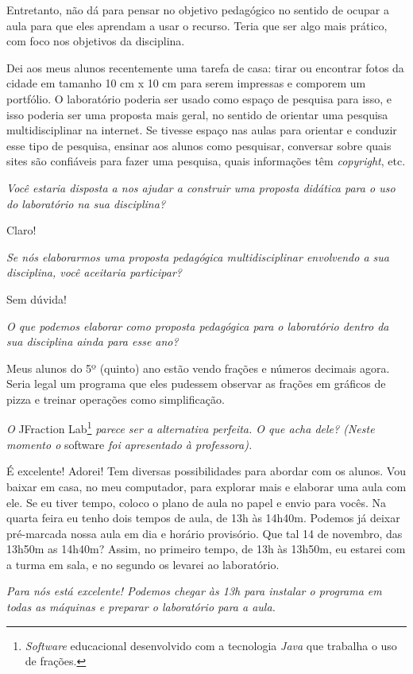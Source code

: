 Entretanto, não dá para pensar no objetivo pedagógico no sentido de ocupar a aula para que eles aprendam a usar o recurso. Teria que ser algo mais prático, com foco nos objetivos da disciplina.

Dei aos meus alunos recentemente uma tarefa de casa: tirar ou encontrar fotos da cidade em tamanho 10 cm x 10 cm para serem impressas e comporem um portfólio. O laboratório poderia ser usado como espaço de pesquisa para isso, e isso poderia ser uma proposta mais geral, no sentido de orientar uma pesquisa multidisciplinar na internet. Se tivesse espaço nas aulas para orientar e conduzir esse tipo de pesquisa, ensinar aos alunos como pesquisar, conversar sobre quais sites são confiáveis para fazer uma pesquisa, quais informações têm \textit{copyright}, etc.

\textit{Você estaria disposta a nos ajudar a construir uma proposta didática para o uso do laboratório na sua disciplina?}

Claro!

\textit{Se nós elaborarmos uma proposta pedagógica multidisciplinar envolvendo a sua disciplina, você aceitaria participar?}

Sem dúvida!

\textit{O que podemos elaborar como proposta pedagógica para o laboratório dentro da sua disciplina ainda para esse ano?}

Meus alunos do 5º (quinto) ano estão vendo frações e números decimais agora. Seria legal um programa que eles pudessem observar as frações em gráficos de pizza e treinar operações como simplificação.

\textit{O} JFraction Lab\footnote{\textit{Software} educacional desenvolvido com a tecnologia \textit{Java} que trabalha o uso de frações.} \textit{parece ser a alternativa perfeita. O que acha dele? (Neste momento o} software \textit{foi apresentado à professora).}

É excelente! Adorei! Tem diversas possibilidades para abordar com os alunos. Vou baixar em casa, no meu computador, para explorar mais e elaborar uma aula com ele. Se eu tiver tempo, coloco o plano de aula no papel e envio para vocês. Na quarta feira eu tenho dois tempos de aula, de 13h às 14h40m. Podemos já deixar pré-marcada nossa aula em dia e horário provisório. Que tal 14 de novembro, das 13h50m as 14h40m? Assim, no primeiro tempo, de 13h às 13h50m, eu estarei com a turma em sala, e no segundo os levarei ao laboratório.

\textit{Para nós está excelente! Podemos chegar às 13h para instalar o programa em todas as máquinas e preparar o laboratório para a aula.}

